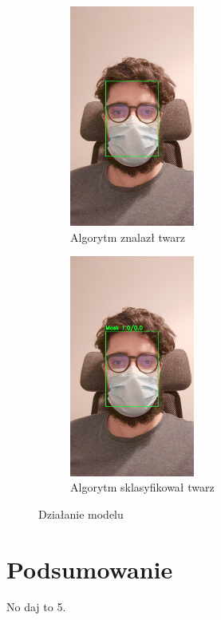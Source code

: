 \documentclass[12pt]{article}
\begin{document}
		\begin{figure}[h]
			\centering
			\begin{subfigure}[b]{0.49\textwidth}
				\centering
				\includegraphics[width=0.45\textwidth]{twarz.jpeg}
				\caption{Algorytm znalazł twarz}
				\label{fig:twarz}
			\end{subfigure}
			\hfil
			\begin{subfigure}[b]{0.49\textwidth}
				\centering
				\includegraphics[width=0.45\textwidth]{maska.jpeg}
				\caption{Algorytm sklasyfikował twarz}
				\label{fig:maska}
			\end{subfigure}
			\caption{Działanie modelu}
		\end{figure}
	\section{Podsumowanie}
	No daj to 5.
	\newpage
	
\end{document}
